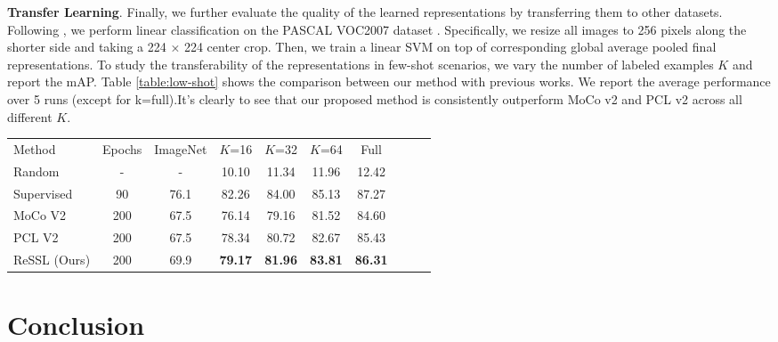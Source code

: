 \documentclass{article}
\newcommand{\<}{\left\langle}
\renewcommand{\>}{\right\rangle}
\begin{document}
\vspace{-5pt}
\textbf{Transfer Learning}. 
Finally, we further evaluate the quality of the learned representations by transferring them to other datasets. Following \cite{PCL}, we perform linear classification on the PASCAL VOC2007 dataset \cite{pascal-voc-2007}. Specifically, we resize all images to 256 pixels along the shorter side and taking a 224 × 224 center crop. Then, we train a linear SVM on top of corresponding global average pooled final representations. To study the transferability of the representations in few-shot scenarios, we vary the number of labeled examples $K$ and report the mAP. Table \ref{table:low-shot} shows the comparison between our method with previous works. We report the average performance over 5 runs (except for k=full).It's clearly to see that our proposed method is consistently outperform MoCo v2 and PCL v2 across all different $K$. 
\vspace{-5pt}

\renewcommand\arraystretch{1.15}
\begin{table*}[h]
 \centering
 \setlength\tabcolsep{7pt}
 \vspace{-8pt}
 \small
 \caption{Transfer learning on low-shot image classification}
 \label{table:low-shot}
\begin{tabular}{l  c c   c  c  c  c  c  c  c} 
\toprule 
Method & Epochs & ImageNet & $K$=16 & $K$=32 & $K$=64 & Full \\
Random & -      & -        & 10.10  & 11.34 & 11.96 & 12.42  \\
Supervised & 90 & 76.1     & 82.26  & 84.00 & 85.13 & 87.27  \\ \hline
MoCo V2 \cite{mocov2} & 200 &  67.5 & 76.14 & 79.16 & 81.52 & 84.60   \\
PCL V2 \cite{PCL} & 200 &  67.5  & 78.34 & 80.72 & 82.67 & 85.43 \\
ReSSL (Ours)     & 200 & 69.9 & \textbf{79.17} & \textbf{81.96} & \textbf{83.81} & \textbf{86.31} \\
\toprule 
\end{tabular}
\vspace{-15pt}
\end{table*}



 \section{Conclusion}
\end{document}
